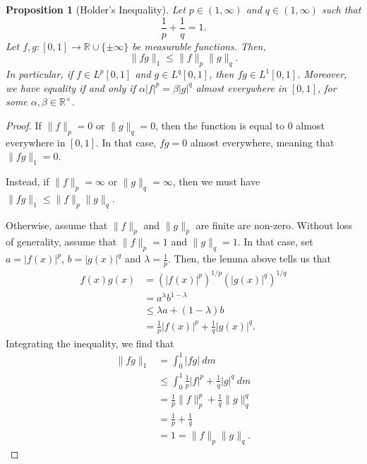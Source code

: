 \documentclass[a4paper, openany]{memoir}
\theoremstyle{definition}
\theoremstyle{plain}
\newtheorem{proposition}[definition]{Proposition}
\begin{document}
    \begin{proposition}[Holder's Inequality]
        Let $p \in (1, \infty)$ and $q \in (1, \infty)$ such that
        \[\frac{1}{p} + \frac{1}{q} = 1.\]
        Let $f, g: [0, 1] \to \mathbb{R} \cup \{\pm \infty\}$ be measurable functions. Then,
        \[\lVert fg \rVert_1 \leq \lVert f \rVert_p \lVert g \rVert_q.\]
        In particular, if $f \in L^p[0, 1]$ and $g \in L^q[0, 1]$, then $fg \in L^1[0, 1]$. Moreover, we have equality if and only if $\alpha |f|^p = \beta |g|^q$ almost everywhere in $[0, 1]$, for some $\alpha, \beta \in \mathbb{R}^\times$.
    \end{proposition}
    \begin{proof}
        If $\lVert f \rVert_p = 0$ or $\lVert g \rVert_q = 0$, then the function is equal to $0$ almost everywhere in $[0, 1]$. In that case, $fg = 0$ almost everywhere, meaning that $\lVert fg \rVert_1 = 0$.

        \noindent Instead, if $\lVert f \rVert_p = \infty$ or $\lVert g \rVert_q = \infty$, then we must have $\lVert fg \rVert_1 \leq \lVert f \rVert_p \lVert g \rVert_q$.

        \noindent Otherwise, assume that $\lVert f \rVert_p$ and $\lVert g \rVert_p$ are finite are non-zero. Without loss of generality, assume that $\lVert f \rVert_p = 1$ and $\lVert g \rVert_q = 1$. In that case, set $a = |f(x)|^p$, $b = |g(x)|^q$ and $\lambda = \frac{1}{p}$. Then, the lemma above tells us that
        \begin{align*}
            f(x) g(x) &= (|f(x)|^p)^{1/p} (|g(x)|^q)^{1/q} \\
            &= a^{\lambda} b^{1 - \lambda} \\
            &\leq \lambda a + (1 - \lambda)b \\
            &= \frac{1}{p} |f(x)|^p + \frac{1}{q} |g(x)|^q.
        \end{align*}
        Integrating the inequality, we find that
        \begin{align*}
            \lVert fg \rVert_1 &= \int_0^1 |fg| \ dm \\
            &\leq \int_0^1 \frac{1}{p} |f|^p + \frac{1}{q} |g|^q \ dm \\
            &= \frac{1}{p} \lVert f \rVert^p_p + \frac{1}{q} \lVert g \rVert^q_q \\
            &= \frac{1}{p} + \frac{1}{q} \\
            &= 1 = \lVert f \rVert_p \lVert g \rVert_q.
        \end{align*}
    \end{proof}
\end{document}
